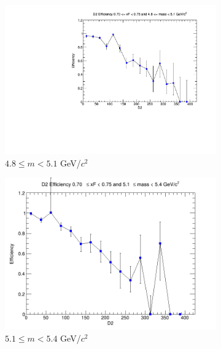 \begin{figure}[p]
\begin{subfigure}[b]{0.32\textwidth}
        \centering
        \includegraphics[width=\textwidth]{./kTrackerEfficiencyPlots/D2_Efficiency_xF14_mass2.pdf}
        \caption{$4.8 \leq m < 5.1$ GeV/$c^2$}
        \label{fig:xF14_mass2}
    \end{subfigure}
    \vspace{0.5cm}
    \begin{subfigure}[b]{0.32\textwidth}
        \centering
        \includegraphics[width=\textwidth]{./kTrackerEfficiencyPlots/D2_Efficiency_xF14_mass3.png}
        \caption{$5.1 \leq m < 5.4$ GeV/$c^2$}
        \label{fig:xF14_mass3}
    \end{subfigure}
    \hfill
    \begin{subfigure}[b]{0.32\textwidth}
        \centering

\end{subfigure}
\end{figure}
